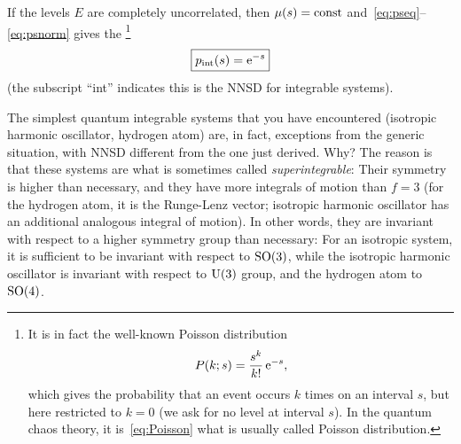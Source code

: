 \documentclass[a4paper,11pt,twoside]{article}
\begin{document}
        If the levels $E$ are completely uncorrelated, then $\mu(s)=\mathrm{const}$ and~\eqref{eq:pseq}--\eqref{eq:psnorm} gives the \footnote{It is in fact the well-known Poisson distribution
        \begin{equation}
            P(k;s)=\frac{s^{k}}{k!}\operatorname{e}^{-s},
        \end{equation}
        which gives the probability that an event occurs $k$ times on an interval $s$, but here restricted to $k=0$ (we ask for no level at interval $s$).
        In the quantum chaos theory, it is~\eqref{eq:Poisson} what is usually called Poisson distribution.}   
        \begin{equation}
            \label{eq:Poisson}
            \boxed{p_{\text{int}}(s)=\operatorname{e}^{-s}}
        \end{equation}
        (the subscript ``int'' indicates this is the NNSD for integrable systems).
        
        The simplest quantum integrable systems that you have encountered (isotropic harmonic oscillator, hydrogen atom) are, in fact, exceptions from the generic situation, with NNSD different from the one just derived. 
        Why? 
        The reason is that these systems are what is sometimes called \emph{superintegrable}: Their symmetry is higher than necessary, and they have more integrals of motion than $f=3$ (for the hydrogen atom, it is the Runge-Lenz vector; isotropic harmonic oscillator has an additional analogous integral of motion).
        In other words, they are invariant with respect to a higher symmetry group than necessary: For an isotropic system, it is sufficient to be invariant with respect to $\mathrm{SO(3)}$, while the isotropic harmonic oscillator is invariant with respect to $\mathrm{U(3)}$ group, and the hydrogen atom to $\mathrm{SO(4)}$.
\end{document}

